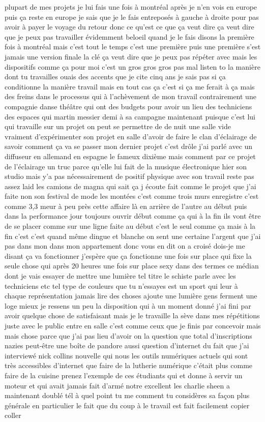 plupart de mes projets je lui fais une fois à montréal après je n'en vois en europe puis ça reste en europe je sais que je le fais entreposés à gauche à droite pour pas avoir à payer le voyage du retour donc ce qu'est ce que ça veut dire ça veut dire que je peux pas travailler évidemment beloeil quand je le fais disons la première fois à montréal mais c'est tout le temps c'est une première puis une première s'est jamais une version finale la clé ça veut dire que je peux pas répéter avec mais les dispositifs comme ça pour moi c'est un gros gros gros pas mal listen to la manière dont tu travailles ouais des accents que je cite cinq ans je sais pas si ça conditionne la manière travail mais en tout cas ça c'est si ça me ferait à ça mais des freins dans le processus qui à l'achèvement de mon travail contrairement une compagnie danse théâtre qui ont des budgets pour avoir un lieu des techniciens des espaces qui martin messier demi à sa campagne maintenant puisque c'est lui qui travaille sur un projet on peut se permettre de de nuit une salle vide vraiment d'expérimenter son projet en salle d'avoir de faire le clan d'éclairage de savoir comment ça va se passer mon dernier projet c'est drôle j'ai parlé avec un diffuseur en allemand en espagne le fameux dixième mais comment par ce projet de l'éclairage un truc parce qu'elle lui fait de la musique électronique hier son studio mais y'a pas nécessairement de positif physique avec son travail reste pas assez laid les camions de magna qui sait ça j écoute fait comme le projet que j'ai faite non son festival de mode les montées c'est comme trois murs enregistre c'est comme 3,3 meur à peu près cette affaire là en arrière de l'autre au début puis dans la performance jour toujours ouvrir début comme ça qui à la fin ils vont être de se placer comme sur une ligne faite au début c'est le seul comme ça mais à la fin c'est c'est quand même dingue et blanche on sent une certaine l'argent que j'ai pas dans mon dans mon appartement donc vous en dit on a croisé dois-je me disant ça va fonctionner j'espère que ça fonctionne une fois sur place qui fixe la seule chose qui après 20 heures une fois sur place sexy dans des termes ce médian dont je vais essayer de mettre une lumière tel titre le schiste parle avec les techniciens etc tel type de couleurs que tu n'essayes est un sport qui leur à chaque représentation jamais lire des choses ajoute une lumière gens ferment une loge mieux je ressens un peu la disposition qui à un moment donné j'ai fini par avoir quelque chose de satisfaisant mais je le travaille la sève dans mes répétitions juste avec le public entre en salle c'est comme ceux que je finis par concevoir mais mais chose parce que j'ai pas lieu d'avoir on la question que total d'inscriptions nazies peut-être une boîte de pandore aussi question d'internet du fait que j'ai interviewé nick collins nouvelle qui nous les outils numériques actuels qui sont très accessibles d'internet que faire de la lutherie numérique c'était plus comme faire de la cuisine prenez l'exemple de ces étudiants qui et donne à servir un moteur et qui avait jamais fait d'armé notre excellent les charlie sheen a maintenant doublé tél à quel point tu me comment tu considères sa façon plus générale en particulier le fait que du coup à le travail est fait facilement copier coller 